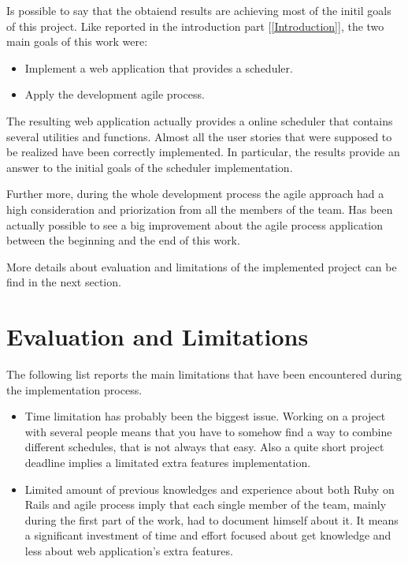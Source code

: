 Is possible to say that the obtaiend results are achieving most of the initil goals of this project. 
Like reported in the introduction part [\ref{Introduction}], the two main goals of this work were: 
\vspace{-5mm}
\begin{itemize}
 \setlength{\itemsep}{-5pt}
 \item Implement a web application that provides a scheduler.
 \item Apply the development agile process.
\end{itemize}

The resulting web application actually provides a online scheduler that contains several utilities and functions. Almost all the user stories that were supposed to be realized have been correctly implemented. In particular, the results provide an answer to the initial goals of the scheduler implementation. 

Further more, during the whole development process the agile approach had a high consideration and priorization from all the members of the team. Has been actually possible to see a big improvement about the agile process application between the beginning and the end of this work.

More details about evaluation and limitations of the implemented project can be find in the next section.
\section{Evaluation and Limitations}
\vspace{-5mm}
\label{Evaluation}
The following list reports the main limitations that have been encountered during the implementation process.
\vspace{-5mm}
\begin{itemize}
 \setlength{\itemsep}{-5pt}
\item Time limitation has probably been the biggest issue. Working on a project with several people means that you have to somehow find a way to combine different schedules, that is not always that easy. Also a quite short project deadline implies a limitated extra features implementation.
\item Limited amount of previous knowledges and experience about both Ruby on Rails and agile process imply that each single member of the team, mainly during the first part of the work, had to document himself about it. It means a significant investment of time and effort focused about get knowledge and less about web application's extra features. 
\end{itemize}

